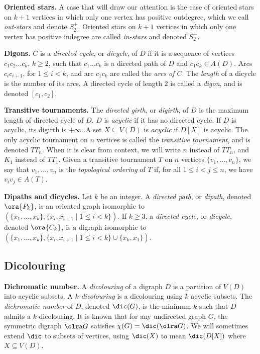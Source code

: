 \textbf{Oriented stars.}
A case that will draw our attention is the case of oriented stars on $k+1$ vertices in which only one vertex has positive outdegree, which we call \emph{out-stars} and denote $S_2^+$. Oriented stars on $k+1$ vertices in which only one vertex has positive indegree are called \emph{in-stars} and denoted $S_2^-$.

\medskip

\textbf{Digons.}
$C$ is a \emph{directed cycle}, or \emph{dicycle}, of $D$ if it is a sequence of vertices $c_1c_2\ldots c_k$, $k \geq 2$, such that $c_1\ldots c_k$ is a directed path of $D$ and $c_1c_k \in A(D)$.
Arcs $c_ic_{i+1}$,  for  $1\leq i <k$, and arc $c_1c_k$ are called the {\em arcs of $C$}.
The {\em length} of a dicycle is the number of its arcs. A directed cycle of length $2$ is called a \emph{digon}, and is denoted $[c_1,c_2]$.

\medskip

\textbf{Transitive tournaments.}
The \emph{directed girth}, or \emph{digirth}, of $D$ is the maximum length of directed cycle of $D$. $D$ is \emph{acyclic} if it has no directed cycle. If $D$ is acyclic, its digirth is $+\infty$. A set $X \subseteq V(D)$ is \emph{acyclic} if $D[X]$ is acyclic. The only acyclic tournament on $n$ vertices is called the \emph{transitive tournament}, and is denoted $TT_{n}$. When it is clear from context, we will write $n$ instead of $TT_n$, and $K_1$ instead of $TT_1$.  Given a transitive tournament $T$ on $n$ vertices $\{v_1, \dots, v_n\}$, we say that $v_1, \dots, v_n$ is the \emph{topological ordering} of $T$ if, for all $1 \le i<j \le n$, we have $v_iv_j \in A(T)$.

\medskip

\textbf{Dipaths and dicycles.}
Let $k$ be an integer. A \emph{directed path}, or \emph{dipath}, denoted $\ora{P_k}$, is an oriented graph isomorphic to $(\{x_1,\dots, x_k\}, \{x_i, x_{i+1} \mid 1 \leq i < k \})$. If $k \geq 3$, a \emph{directed cycle}, or \emph{dicycle}, denoted $\ora{C_k}$, is a digraph isomorphic to $(\{x_1,\dots, x_k\}, \{x_i, x_{i+1} \mid 1 \leq i < k \} \cup \{x_k,x_1\})$.


\subsection{Dicolouring}


\textbf{Dichromatic number.}
A \emph{dicolouring} of a digraph $D$ is a partition of $V(D)$ into acyclic subsets. A \emph{$k$-dicolouring} is a dicolouring using $k$ acyclic subsets. The \emph{dichromatic number} of $D$, denoted $\dic(G)$, is the minimum $k$ such that $D$ admits a $k$-dicolouring.
It is known that for any undirected graph $G$, the symmetric digraph $\olra G$ satisfies $\chi(G) = \dic(\olra G)$. We will sometimes extend $\dic$ to subsets of vertices, using $\dic(X)$ to mean $\dic(D[X])$ where $X \subseteq V(D)$.

